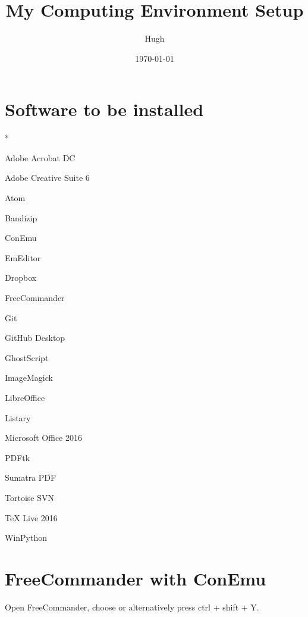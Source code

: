 \documentclass{hzguide}
\title{My Computing Environment Setup}
\author{Hugh}
\date{\today}
\begin{document}
\maketitle
\tableofcontents*

\section{Software to be installed}

\begin{opt}*
\item Adobe Acrobat DC
\item Adobe Creative Suite 6
\item Atom
\item Bandizip
\item ConEmu
\item EmEditor
\item Dropbox
\item FreeCommander
\item Git
\item GitHub Desktop
\item GhostScript
\item ImageMagick
\item LibreOffice
\item Listary
\item Microsoft Office 2016
\item PDFtk
\item Sumatra PDF
\item Tortoise SVN
\item TeX Live 2016
\item WinPython
\end{opt}

\section{FreeCommander with ConEmu}

Open FreeCommander, choose  or alternatively press ctrl + shift + Y.


\end{document}
